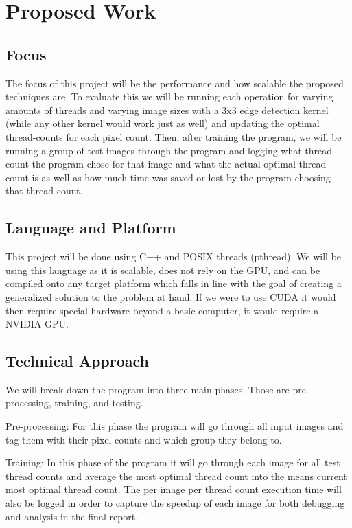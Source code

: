 \documentclass{article}
\begin{document}
    \section{Proposed Work}
        \begin{multicols}{2}
            \subsection{Focus}
                The focus of this project will be the performance and how scalable the proposed techniques are.  To evaluate this we will be running each operation for varying amounts of threads and varying image sizes with a 3x3 edge detection kernel (while any other kernel would work just as well) and updating the optimal thread-counts for each pixel count.  Then, after training the program, we will be running a group of test images through the program and logging what thread count the program chose for that image and what the actual optimal thread count is as well as how much time was saved or lost by the program choosing that thread count.
            
            \subsection{Language and Platform}
                This project will be done using C++ and POSIX threads (pthread).  We will be using this language as it is scalable, does not rely on the GPU, and can be compiled onto any target platform which falls in line with the goal of creating a generalized solution to the problem at hand.  If we were to use CUDA it would then require special hardware beyond a basic computer, it would require a NVIDIA GPU.
        
            \subsection{Technical Approach}
                We will break down the program into three main phases.  Those are pre-processing, training, and testing.
                
                Pre-processing:  For this phase the program will go through all input images and tag them with their pixel counts and which group they belong to.
                
                Training: In this phase of the program it will go through each image for all test thread counts and average the most optimal thread count into the means current most optimal thread count.  The per image per thread count execution time will also be logged in order to capture the speedup of each image for both debugging and analysis in the final report.
                

\end{multicols}
\end{document}
